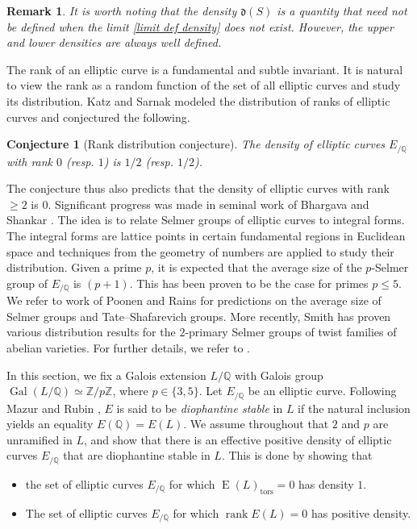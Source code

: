 \documentclass[12pt]{amsart}
\newtheorem{remark}[theorem]{Remark}
\newtheorem{conjecture}[theorem]{Conjecture}
\newcommand{\Z}{\mathbb{Z}}
\newcommand{\Q}{\mathbb{Q}}
\newcommand{\op}[1]{\operatorname{#1}}
\numberwithin{equation}{section}
\begin{document}
\begin{remark}
    It is worth noting that the density $\mathfrak{d}(S)$ is a quantity that need not be defined when the limit \eqref{limit def density} does not exist. However, the upper and lower densities are always well defined. 
\end{remark}

The rank of an elliptic curve is a fundamental and subtle invariant. It is natural to view the rank as a random function of the set of all elliptic curves and study its distribution. Katz and Sarnak modeled the distribution of ranks of elliptic curves and conjectured the following.

\begin{conjecture}[Rank distribution conjecture]
    The density of elliptic curves $E_{/\Q}$ with rank $0$ (resp. $1$) is $1/2$ (resp. $1/2$). 
\end{conjecture}
The conjecture thus also predicts that the density of elliptic curves with rank $\geq 2$ is $0$. Significant progress was made in seminal work of Bhargava and Shankar \cite{BhargavaShankarbinary, bhargavashankar15, bhargavashankar5}. The idea is to relate Selmer groups of elliptic curves to integral forms. The integral forms are lattice points in certain fundamental regions in Euclidean space and techniques from the geometry of numbers are applied to study their distribution. Given a prime $p$, it is expected that the average size of the $p$-Selmer group of $E_{/\Q}$ is $(p+1)$. This has been proven to be the case for primes $p\leq 5$. We refer to work of Poonen and Rains \cite{poonenrains} for predictions on the average size of Selmer groups and Tate--Shafarevich groups. More recently, Smith has proven various distribution results for the $2$-primary Selmer groups of twist families of abelian varieties. For further details, we refer to \cite{Smith1, Smith2, smith3}.

\par In this section, we fix a Galois extension $L/\Q$ with Galois group $\op{Gal}(L/\Q)\simeq \Z/p\Z$, where $p\in \{3,5\}$. Let $E_{/\Q}$ be an elliptic curve. Following Mazur and Rubin \cite{Mazurrubindiophantine}, $E$ is said to be \emph{diophantine stable} in $L$ if the natural inclusion yields an equality $E(\Q)=E(L)$. We assume throughout that $2$ and $p$ are unramified in $L$, and show that there is an effective positive density of elliptic curves $E_{/\Q}$ that are diophantine stable in $L$. This is done by showing that
\begin{itemize}
    \item the set of elliptic curves $E_{/\Q}$ for which $\op{E}(L)_{\op{tors}}=0$ has density $1$.
    \item The set of elliptic curves $E_{/\Q}$ for which $\op{rank}E(L)=0$ has positive density.
\end{itemize}
\end{document}
